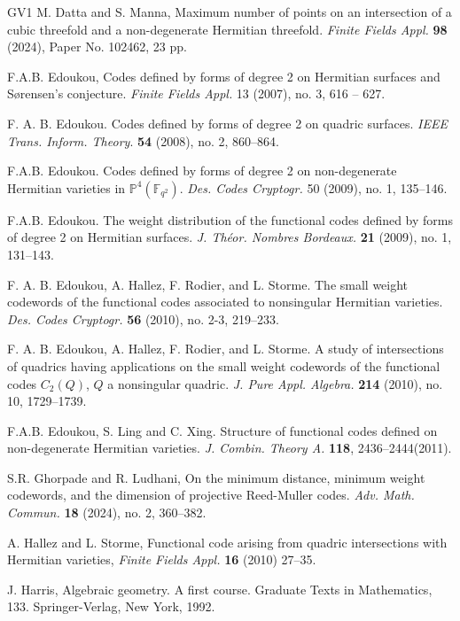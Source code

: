 \documentclass[10pt,a4paper,oneside]{amsproc}
\newcommand{\Fqt}{\mathbb{F}_{q^2}}
\begin{document}
\begin{thebibliography}{GV1}
  M. Datta and S. Manna, Maximum number of points on an intersection of a cubic threefold and a non-degenerate Hermitian threefold. \emph{Finite Fields Appl.} {\bf 98} (2024), Paper No. 102462, 23 pp.

 F.A.B. Edoukou, Codes defined by forms of degree 2 on Hermitian surfaces and S{\o}rensen's conjecture. \emph{Finite Fields Appl.} 13 (2007), no. 3, 616 -- 627.

F. A. B. Edoukou.
Codes defined by forms of degree 2 on quadric surfaces.
\emph{IEEE Trans. Inform. Theory}. \textbf{54} (2008), no. 2, 860–864.

 F.A.B. Edoukou.
 Codes defined by forms of degree 2 on non-degenerate Hermitian varieties in $\mathbb{P}^4 (\Fqt)$. \emph{Des. Codes Cryptogr.} 50 (2009), no. 1, 135–146.

F.A.B. Edoukou.
The weight distribution of the functional codes defined by forms of degree 2 on Hermitian surfaces.
\textit{J. Théor. Nombres Bordeaux.} \textbf{21} (2009), no. 1, 131–143.


 F. A. B. Edoukou, A. Hallez, F. Rodier, and L. Storme.
The small weight codewords of the functional codes associated to nonsingular Hermitian varieties.
\emph{Des. Codes Cryptogr.} {\bf 56} (2010), no. 2-3, 219–233.

F. A. B. Edoukou, A. Hallez, F. Rodier, and L. Storme. 
A study of intersections of quadrics having applications on the small weight codewords of the functional codes $C_2(Q)$, $Q$ a nonsingular quadric.
\emph{J. Pure Appl. Algebra.} \textbf{214} (2010), no. 10, 1729–1739.

 F.A.B. Edoukou, S. Ling and C. Xing. Structure of functional codes defined on non-degenerate Hermitian varieties. \emph{J. Combin. Theory A.} {\bf 118}, 2436--2444(2011). 

S.R. Ghorpade and R. Ludhani, On the minimum distance, minimum weight codewords, and the dimension of projective Reed-Muller codes. \emph{Adv. Math. Commun.} {\bf 18} (2024), no. 2, 360–382. 


A. Hallez and L. Storme, Functional code arising from quadric intersections with Hermitian varieties, \emph{Finite Fields Appl.} {\bf 16} (2010) 27--35.

J. Harris,  Algebraic geometry. A first course. Graduate Texts in Mathematics, 133. Springer-Verlag, New York, 1992.  



\end{thebibliography}
\end{document}
